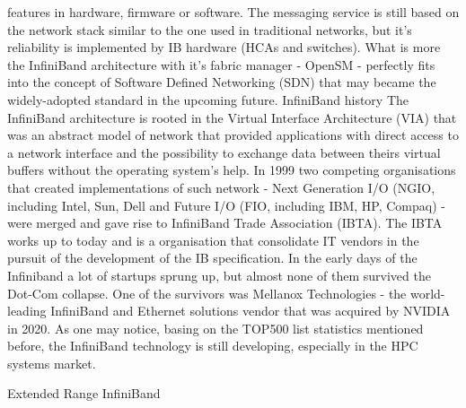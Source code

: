 \documentclass[magisterska,en]{pracamgr}
\begin{document}
features in hardware, firmware or software. The messaging service is still based on the network stack similar to the one used in traditional networks, but it's reliability is implemented by IB hardware (HCAs and switches).\cite{ibta_IB_whitepaper} What is more the InfiniBand architecture with it's fabric manager - OpenSM - perfectly fits into the concept of Software Defined Networking (SDN) that may became the widely-adopted standard in the upcoming future. \cite{SND_whitepaper, Past_protocols_presentation}
InfiniBand history
The InfiniBand architecture is rooted in the Virtual Interface Architecture (VIA) \cite{via} that was an abstract model of network that provided applications with direct access to a network interface and the possibility to exchange data between theirs virtual buffers without the operating system's help. In 1999 two competing organisations that created implementations of such network - Next Generation I/O (NGIO, including Intel, Sun, Dell and Future I/O (FIO, including IBM, HP, Compaq) \cite{oracle_blog} - were merged and gave rise to InfiniBand Trade Association (IBTA). The IBTA works up to today and is a organisation that consolidate IT vendors in the pursuit of the development of the IB specification. In the early days of the Infiniband a lot of startups sprung up, but almost none of them survived the Dot-Com collapse. One of the survivors was Mellanox Technologies - the world-leading InfiniBand and Ethernet solutions vendor that was acquired by NVIDIA in 2020.\cite{mlnx_timeline} As one may notice, basing on the TOP500 list statistics mentioned before, the InfiniBand technology is still developing, especially in the HPC systems market.

Extended Range InfiniBand
\end{document}
